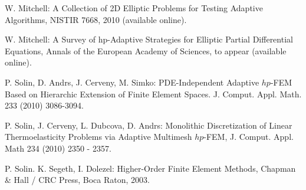 \documentclass[12pt]{elsarticle}
\begin{document}
\begin{thebibliography}{[KLR73]}

W. Mitchell: A Collection of 2D Elliptic Problems for
Testing Adaptive Algorithms, NISTIR 7668, 2010 (available online).

\vspace{-2mm}

W. Mitchell: A Survey of hp-Adaptive Strategies for Elliptic Partial Differential Equations,
Annals of the European Academy of Sciences, to appear (available online).

\vspace{-2mm}



P. Solin, D. Andrs, J. Cerveny, M. Simko:
PDE-Independent Adaptive $hp$-FEM Based on Hierarchic Extension of Finite Element Spaces.
J. Comput. Appl. Math. 233 (2010) 3086-3094.

\vspace{-2mm}

P. Solin, J. Cerveny, L. Dubcova, D. Andrs:
Monolithic Discretization of Linear Thermoelasticity Problems
via Adaptive Multimesh $hp$-FEM, J. Comput. Appl. Math 234 (2010) 2350 - 2357.

\vspace{-2mm}

P. Solin. K. Segeth, I. Dolezel: Higher-Order Finite Element Methods, Chapman \& Hall
/ CRC Press, Boca Raton, 2003.
\end{thebibliography}

\end{document}
